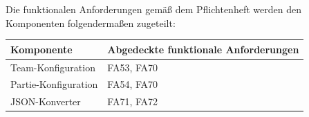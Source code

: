 Die funktionalen Anforderungen gemäß dem Pflichtenheft werden den Komponenten folgendermaßen zugeteilt:

\begin{table}[h]
    \centering
    \begin{tabular}{|l|l|}
        \hline
        \textbf{Komponente} & \textbf{Abgedeckte funktionale Anforderungen}\\ \hline
        Team-Konfiguration & FA53, FA70 \\ \hline

        Partie-Konfiguration & FA54, FA70 \\ \hline

        JSON-Konverter & FA71, FA72 \\ \hline


    \end{tabular}
\end{table}
